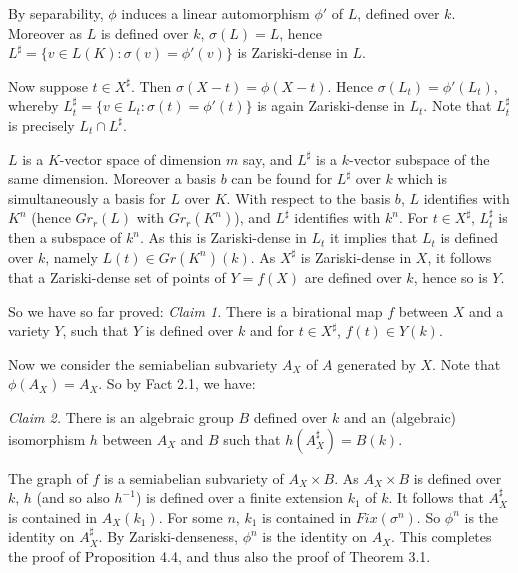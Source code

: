 By separability, $\phi$ induces a linear
automorphism $\phi'$ of $L$, defined over $k$.
Moreover as $L$ is defined over $k$,
$\sigma(L) = L$, hence
$L^{\sharp} =
\{v\in L(K):\sigma(v) =
\phi'(v)\}$ is Zariski-dense in
$L$.

Now suppose $t\in X^{\sharp}$. Then
$\sigma(X-t) = \phi(X-t)$. Hence
$\sigma(L_{t}) = \phi'(L_{t})$, whereby
$L_{t}^{\sharp} = \{v\in L_{t}:\sigma(t) =
\phi'(t)\}$ is again Zariski-dense in $L_{t}$.
Note that $L_{t}^{\sharp}$ is precisely
$L_{t}\cap L^{\sharp}$.

$L$ is a $K$-vector space of dimension $m$
say, and $L^{\sharp}$ is a $k$-vector subspace
of the same dimension. Moreover a basis $b$
can be found for $L^{\sharp}$ over $k$ which is
simultaneously a basis for $L$ over $K$. With
respect to the basis $b$, $L$ identifies with
$K^{n}$ (hence $Gr_{r}(L)$ with
$Gr_{r}(K^{n})$), and
$L^{\sharp}$ identifies with
$k^{n}$. For $t\in X^{\sharp}$,
$L_{t}^{\sharp}$ is then a subspace of
$k^{n}$. As this is Zariski-dense in $L_{t}$
it implies that $L_{t}$ is defined over $k$,
namely $L(t)\in Gr(K^{n})(k)$. As $X^{\sharp}$
is Zariski-dense in $X$, it follows that a
Zariski-dense set of points of $Y = f(X)$ are
defined over $k$, hence so is $Y$.

So we have so far proved:
\newline
{\em Claim 1.} There is a
birational map $f$ between $X$ and a variety
$Y$, such that $Y$ is defined over $k$ and for
$t\in X^{\sharp}$, $f(t)\in Y(k)$.

\vspace{2mm}
\noindent
Now we consider the semiabelian subvariety
$A_{X}$ of $A$ generated by $X$. Note that
$\phi(A_{X}) = A_{X}$. So by Fact 2.1, we have:

\vspace{2mm}
\noindent
{\em Claim 2.} There is an algebraic group $B$
defined over $k$ and an (algebraic) isomorphism
$h$ between $A_{X}$ and $B$ such that
$h(A_{X}^{\sharp}) = B(k)$.

\vspace{5mm}
\noindent
The graph of $f$ is a semiabelian subvariety
of $A_{X}\times B$. As $A_{X}\times B$ is
defined over $k$, $h$ (and so also $h^{-1}$) is
defined over a finite extension $k_{1}$ of
$k$. It follows that $A_{X}^{\sharp}$ is
contained in $A_{X}(k_{1})$. For some $n$,
$k_{1}$ is contained in $Fix(\sigma^{n})$. So
$\phi^{n}$ is the identity on $A_{X}^{\sharp}$.
By Zariski-denseness, $\phi^{n}$ is the
identity on $A_{X}$. This completes the proof
of Proposition 4.4, and thus also the
proof of Theorem 3.1.

